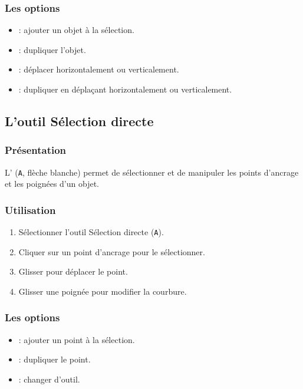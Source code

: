 \subsubsection{Les options}

\begin{itemize}
    \item {} : ajouter un objet à la sélection.
    \item {} : dupliquer l'objet.
    \item {} : déplacer horizontalement ou verticalement.
    \item {} : dupliquer en déplaçant horizontalement ou verticalement.
\end{itemize}

\subsection{L'outil Sélection directe}

\subsubsection{Présentation}

L' (\texttt{A}, flèche blanche) permet de sélectionner et de manipuler les points d'ancrage et les poignées d'un objet.

\subsubsection{Utilisation}

\begin{enumerate}
    \item Sélectionner l'outil Sélection directe (\texttt{A}).
    \item Cliquer sur un point d'ancrage pour le sélectionner.
    \item Glisser pour déplacer le point.
    \item Glisser une poignée pour modifier la courbure.
\end{enumerate}

\subsubsection{Les options}

\begin{itemize}
    \item {} : ajouter un point à la sélection.
    \item {} : dupliquer le point.
    \item {} : changer d'outil.
\end{itemize}

